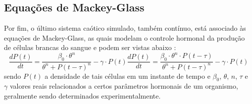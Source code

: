 \documentclass[a4paper, 12pt]{article}
\begin{document}
\subsection{Equações de Mackey-Glass}

Por fim, o último sistema caótico simulado, também contínuo, está associado às equações de Mackey-Glass, as quais modelam o controle hormonal da produção de células brancas do sangue e podem ser vistas abaixo \cite{mackey1977oscillation}:
\begin{subequations}
\begin{equation}
\frac{dP(t)}{dt} = \frac{\beta_0\cdot \theta^n}{\theta^n + P(t - \tau)^n} - \gamma\cdot P(t)
\end{equation}
\begin{equation}\label{eq:mackey-glass-chaos}
\frac{dP(t)}{dt} = \frac{\beta_0\cdot \theta^n \cdot P(t - \tau)}{\theta^n + P(t - \tau)^n} - \gamma\cdot P(t)
\end{equation}
\end{subequations}
sendo $P(t)$ a densidade de tais células em um instante de tempo e $\beta_0$, $\theta$, $n$, $\tau$ e $\gamma$ valores reais relacionados a certos parâmetros hormonais de um organismo, geralmente sendo determinados experimentalmente.
\end{document}
